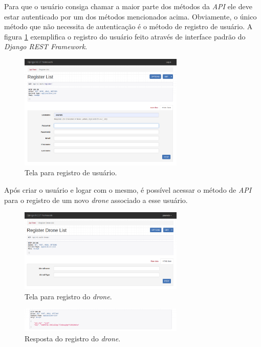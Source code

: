 \documentclass[12pt,a4paper,oneside]{book}
\begin{document}
Para que o usuário consiga chamar a maior parte dos métodos da \textit{API} ele deve estar autenticado por um dos métodos mencionados acima. Obviamente, o único método que não necessita de autenticação é o método de registro de usuário. A figura \ref{fig:regster_user.png.0} exemplifica o registro do usuário feito através de interface padrão do \textit{Django REST Framework}.
%
\begin{figure}[!htbp]
  \centering
  \includegraphics[width=0.7\textwidth]{Images/Desenvolvimento/register_user.png}
  \caption{Tela para registro de usuário.}
  \label{fig:regster_user.png.0}
\end{figure}
%
Após criar o usuário e logar com o mesmo, é possível acessar o método de \textit{API} para o registro de um novo \textit{drone} associado a esse usuário. 
%
\begin{figure}[!htbp]
  \centering
  \includegraphics[width=0.7\textwidth]{Images/Desenvolvimento/drone_register.png}
  \caption{Tela para registro do \textit{drone}.}
  \label{fig:drone_register.png.0}
\end{figure}
%
%
\begin{figure}[!htbp]
  \centering
  \includegraphics[width=0.7\textwidth]{Images/Desenvolvimento/register_drone_resp.png}
  \caption{Resposta do registro do \textit{drone}.}
  \label{fig:register_drone_resp.png.0}
\end{figure}
\end{document}
